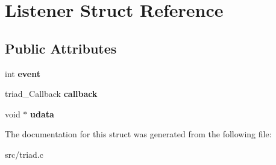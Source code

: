 \hypertarget{struct_listener}{}\section{Listener Struct Reference}
\label{struct_listener}
\subsection*{Public Attributes}
\begin{DoxyCompactItemize}
\item 
\mbox{\label{struct_listener_ad9cca6048e98b9e90c182925ea50ba4d}} 
int {\bfseries event}
\item 
\mbox{\label{struct_listener_accc5bca47eb487c3fa628c5c60efe177}} 
triad\+\_\+\+Callback {\bfseries callback}
\item 
\mbox{\label{struct_listener_a1548b6c3ef62d362b42dba7b4c6080c6}} 
void $\ast$ {\bfseries udata}
\end{DoxyCompactItemize}


The documentation for this struct was generated from the following file\+:\begin{DoxyCompactItemize}
\item 
src/triad.\+c\end{DoxyCompactItemize}
